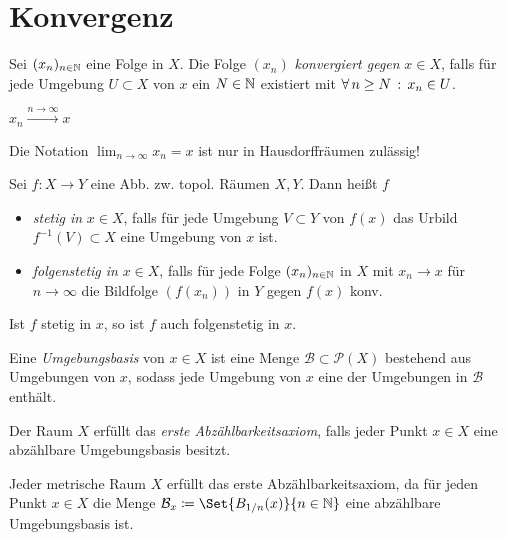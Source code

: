 \documentclass{cheat-sheet}
\begin{document}
\section{Konvergenz}

\begin{defn}
  Sei $(x_n)_{n \in \mathbb{N}}$ eine Folge in $X$. Die Folge $(x_n)$ \emph{konvergiert gegen} $x \in X$, falls für jede Umgebung $U \subset X$ von $x$ ein $N \in \mathbb{N}$ existiert mit $\forall \, {n \geq N} \,:\, x_n \in U$.
\end{defn}

\begin{nota}
  $x_n \xrightarrow{n \to \infty} x$
\end{nota}

\begin{bem}
  Die Notation $\!\lim_{n \to \infty} \! x_n = x$ ist nur in Hausdorffräumen zulässig!
\end{bem}

\begin{defn}
  Sei $f : X {\to} Y$ eine Abb. zw. topol. Räumen $X, Y$. Dann heißt $f$
  \begin{itemize}
    \item \emph{stetig in} $x \in X$, falls für jede Umgebung $V \subset Y$ von $f(x)$ das Urbild $f^{-1}(V) \subset X$ eine Umgebung von $x$ ist.
    \item \emph{folgenstetig in} $x \in X$, falls für jede Folge $(x_n)_{n \in \mathbb{N}}$ in $X$ mit $x_n \to x$ für $n \to \infty$ die Bildfolge $(f(x_n))$ in $Y$ gegen $f(x)$ konv.
  \end{itemize}
\end{defn}

\begin{prop}
  Ist $f$ stetig in $x$, so ist $f$ auch folgenstetig in $x$.
\end{prop}

\begin{defn}
  Eine \emph{Umgebungsbasis} von $x \in X$ ist eine Menge $\mathcal{B} \subset \mathcal{P}(X)$ bestehend aus Umgebungen von $x$, sodass jede Umgebung von $x$ eine der Umgebungen in $\mathcal{B}$ enthält.
\end{defn}

\begin{defn}
  Der Raum $X$ erfüllt das \emph{erste Abzählbarkeitsaxiom}, falls jeder Punkt $x \in X$ eine abzählbare Umgebungsbasis besitzt.
\end{defn}

\begin{bem}
  Jeder metrische Raum $X$ erfüllt das erste Abzählbarkeitsaxiom, da für jeden Punkt $x \in X$ die Menge $\mathcal{B}_x \coloneqq \Set{B_{1/n}(x)}{n\in\N}$ eine abzählbare Umgebungsbasis ist.
\end{bem}
\end{document}
